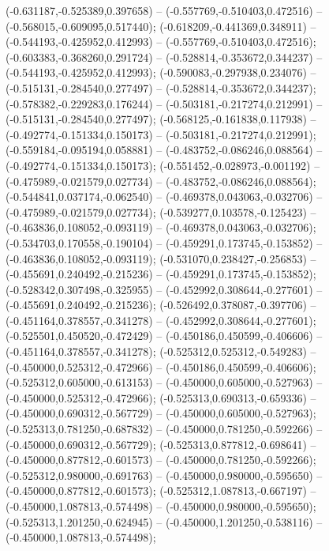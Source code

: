  (-0.631187,-0.525389,0.397658) -- (-0.557769,-0.510403,0.472516) -- (-0.568015,-0.609095,0.517440);
 (-0.618209,-0.441369,0.348911) -- (-0.544193,-0.425952,0.412993) -- (-0.557769,-0.510403,0.472516);
 (-0.603383,-0.368260,0.291724) -- (-0.528814,-0.353672,0.344237) -- (-0.544193,-0.425952,0.412993);
 (-0.590083,-0.297938,0.234076) -- (-0.515131,-0.284540,0.277497) -- (-0.528814,-0.353672,0.344237);
 (-0.578382,-0.229283,0.176244) -- (-0.503181,-0.217274,0.212991) -- (-0.515131,-0.284540,0.277497);
 (-0.568125,-0.161838,0.117938) -- (-0.492774,-0.151334,0.150173) -- (-0.503181,-0.217274,0.212991);
 (-0.559184,-0.095194,0.058881) -- (-0.483752,-0.086246,0.088564) -- (-0.492774,-0.151334,0.150173);
 (-0.551452,-0.028973,-0.001192) -- (-0.475989,-0.021579,0.027734) -- (-0.483752,-0.086246,0.088564);
 (-0.544841,0.037174,-0.062540) -- (-0.469378,0.043063,-0.032706) -- (-0.475989,-0.021579,0.027734);
 (-0.539277,0.103578,-0.125423) -- (-0.463836,0.108052,-0.093119) -- (-0.469378,0.043063,-0.032706);
 (-0.534703,0.170558,-0.190104) -- (-0.459291,0.173745,-0.153852) -- (-0.463836,0.108052,-0.093119);
 (-0.531070,0.238427,-0.256853) -- (-0.455691,0.240492,-0.215236) -- (-0.459291,0.173745,-0.153852);
 (-0.528342,0.307498,-0.325955) -- (-0.452992,0.308644,-0.277601) -- (-0.455691,0.240492,-0.215236);
 (-0.526492,0.378087,-0.397706) -- (-0.451164,0.378557,-0.341278) -- (-0.452992,0.308644,-0.277601);
 (-0.525501,0.450520,-0.472429) -- (-0.450186,0.450599,-0.406606) -- (-0.451164,0.378557,-0.341278);
 (-0.525312,0.525312,-0.549283) -- (-0.450000,0.525312,-0.472966) -- (-0.450186,0.450599,-0.406606);
 (-0.525312,0.605000,-0.613153) -- (-0.450000,0.605000,-0.527963) -- (-0.450000,0.525312,-0.472966);
 (-0.525313,0.690313,-0.659336) -- (-0.450000,0.690312,-0.567729) -- (-0.450000,0.605000,-0.527963);
 (-0.525313,0.781250,-0.687832) -- (-0.450000,0.781250,-0.592266) -- (-0.450000,0.690312,-0.567729);
 (-0.525313,0.877812,-0.698641) -- (-0.450000,0.877812,-0.601573) -- (-0.450000,0.781250,-0.592266);
 (-0.525312,0.980000,-0.691763) -- (-0.450000,0.980000,-0.595650) -- (-0.450000,0.877812,-0.601573);
 (-0.525312,1.087813,-0.667197) -- (-0.450000,1.087813,-0.574498) -- (-0.450000,0.980000,-0.595650);
 (-0.525313,1.201250,-0.624945) -- (-0.450000,1.201250,-0.538116) -- (-0.450000,1.087813,-0.574498);
